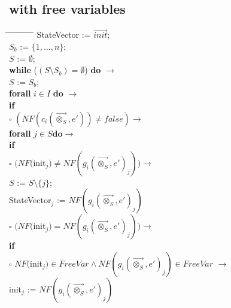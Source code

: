 \index{}\documentclass[a4paper,10pt]{article}
\theoremstyle{plain}
\theoremstyle{definition}
\newcommand{\ovr}{\overrightarrow}
\newcommand{\tb}{\textbf}
\newcommand{\ra}{$\rightarrow$}
\newcommand{\sq}{$\square$}
\begin{document}
\newpage
\subsection{with free variables}
\begin{tabbing} 
\hspace*{5.mm} \= \hspace*{5.mm} \= \hspace*{5.mm} \= \hspace*{5.mm} \= \hspace*{5.mm} \= \hspace*{5.mm}  \= \hspace*{5.mm}  \= \hspace*{5.mm}  \= \hspace*{5.mm} \= \hspace*{5.mm} \= \hspace*{5.mm}\kill
StateVector := $\ovr{init}$; \\
$S_b$ := $\lbrace 1, \ldots, n \rbrace$; \\
$S$ := $\emptyset$;\\ 
\tb{while}  ($ (S \setminus S_b) = \emptyset $) \tb{do} \ra \\
  \> $S$ := $S_b$; \\
  \> \tb{forall} $i \in I$ \tb{do} \ra \\
  \>	\>	\tb{if} \\
  \>	\>	\sq \> $(NF(c_i(\ovr{\otimes_S},e')) \not= false) \rightarrow$ \\
  \>	\>	\>  	\>  \tb{forall} $j \in S \tb{do} \rightarrow$ \\
  \>	\>	\>  	\>	\>  	    \tb{if} \\
  \>	\>	\>  	\>   	\>         $\square$  \> $(NF($init$_j) \neq NF(g_i(\ovr{\otimes_S}, e')_j)) \rightarrow$ \\
  \>	\>	\>  	\>    	\>       \>    \>       $S$ := $S\setminus \lbrace j \rbrace$;\\
  \> 	\>	\>	\>	\>	\>	\>	StateVector$_j$ := $NF(g_i(\ovr{\otimes_S}, e')_j)$\\
 \>	\>	\>  	\>    	\>        $\square$ \> $ (NF($init$_j) = NF(g_i(\ovr{\otimes_S}, e')_j)) \rightarrow$\\
  \>	\>	\> 	\>    	\>        \> 	\>  	\tb{if}\\
  \>	\>	\>	\>	\>	  \>	\>	\sq 	\> $NF($init$_j) \in FreeVar \wedge NF(g_i(\ovr{\otimes_S}, e')_j) \in FreeVar$ \ra \\
  \>	\>	\>	\>	\>	  \>	\>		\>	\>	init$_j$ := $NF(g_i(\ovr{\otimes_S}, e')_j)$\\ 


\end{tabbing}
\end{document}
